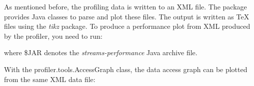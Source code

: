 \documentclass[german,a4,12pt]{scrartcl}
\begin{document}
As mentioned before, the profiling data is written to an XML file. The package provides Java classes
to parse and plot these files. The output is written as TeX files using the {\em tikz} package. To
produce a performance plot from XML produced by the profiler, you need to run:
\begin{center}
\end{center}
where {\ttfamily \$JAR} denotes the {\em streams-performance} Java archive file.

With the {\ttfamily profiler.tools.AccessGraph} class, the data access graph can be plotted from the
same XML data file:
\begin{center}
\end{center}
\end{document}
